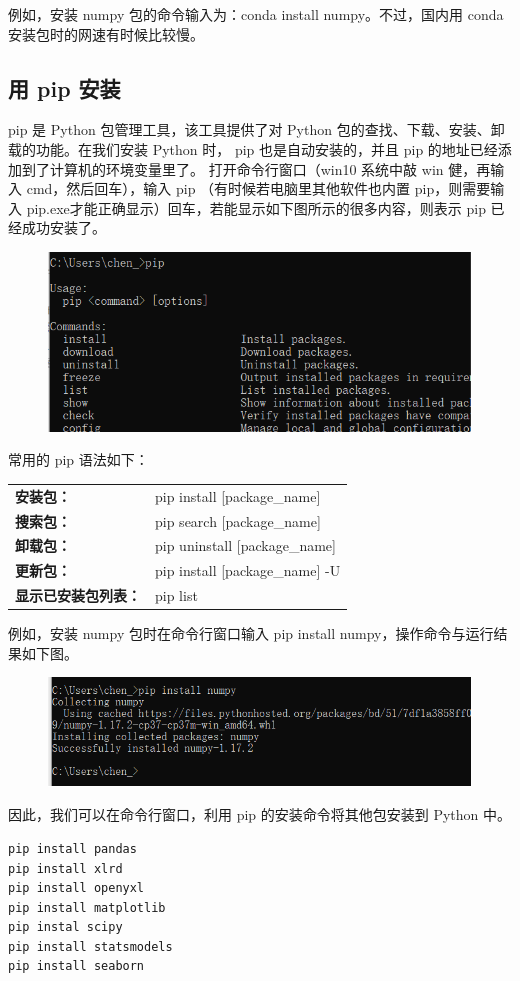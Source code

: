 例如，安装 numpy 包的命令输入为：conda install numpy。不过，国内用 conda 安装包时的网速有时候比较慢。

\subsection{用 pip 安装}
pip 是 Python 包管理工具，该工具提供了对 Python 包的查找、下载、安装、卸载的功能。在我们安装 Python 时， pip 也是自动安装的，并且 pip 的地址已经添加到了计算机的环境变量里了。 打开命令行窗口（win10 系统中敲 win 健，再输入 cmd，然后回车），输入 pip （有时候若电脑里其他软件也内置 pip，则需要输入 pip.exe才能正确显示）回车，若能显示如下图所示的很多内容，则表示 pip 已经成功安装了。

\begin{figure}[!ht]
  \centering
  \includegraphics[scale=0.6]{figure/chapter1/pip.png}
\end{figure}

常用的 pip 语法如下：

\begin{center}
\begin{tcolorbox}[title = pip 的常用语法]
  \centering\bf
  \begin{tcboutputlisting}
  \begin{tabular}{>{\bfseries}ll}
    安装包：&pip install [package\_name]\\
    搜索包：&pip search [package\_name]\\
    卸载包：&pip uninstall [package\_name]\\
    更新包： & pip install [package\_name] -U\\
  显示已安装包列表： &pip list
  \end{tabular}
\end{tcboutputlisting}
\end{tcolorbox}
\end{center}

例如，安装 numpy 包时在命令行窗口输入 pip install numpy，操作命令与运行结果如下图。
\begin{figure}[!ht]
  \centering
  \includegraphics[scale=0.6]{figure/chapter1/pip2.png}
\end{figure}



因此，我们可以在命令行窗口，利用 pip 的安装命令将其他包安装到 Python 中。

\begin{lstlisting}
pip install pandas
pip install xlrd
pip install openyxl
pip install matplotlib
pip instal scipy
pip install statsmodels
pip install seaborn
\end{lstlisting}
